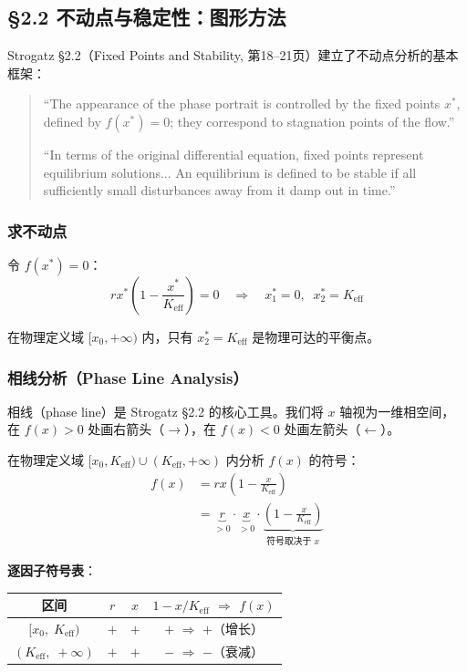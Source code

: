 \documentclass[12pt,a4paper]{article}
\begin{document}
\subsection{\S2.2 不动点与稳定性：图形方法}

Strogatz \S2.2（Fixed Points and Stability, 第18--21页）建立了不动点分析的基本框架：

\begin{quote}
\small
``The appearance of the phase portrait is controlled by the fixed points $x^*$, defined by
$f(x^*) = 0$; they correspond to stagnation points of the flow.''

\medskip
``In terms of the original differential equation, fixed points represent equilibrium solutions...
An equilibrium is defined to be stable if all sufficiently small disturbances away from it damp
out in time.''
\end{quote}

\subsubsection{求不动点}
令 $f(x^*) = 0$：
\begin{equation}
r x^* \left(1 - \frac{x^*}{K_{\text{eff}}}\right) = 0
\quad\Rightarrow\quad x^*_1 = 0,\;\; x^*_2 = K_{\text{eff}}
\end{equation}

在物理定义域 $[x_0, +\infty)$ 内，只有 $x^*_2 = K_{\text{eff}}$ 是物理可达的平衡点。

\subsubsection{相线分析（Phase Line Analysis）}
相线（phase line）是 Strogatz \S2.2 的核心工具。我们将 $x$ 轴视为一维相空间，
在 $f(x) > 0$ 处画右箭头（$\to$），在 $f(x) < 0$ 处画左箭头（$\leftarrow$）。

在物理定义域 $[x_0, K_{\text{eff}}) \cup (K_{\text{eff}}, +\infty)$ 内分析 $f(x)$ 的符号：
\begin{align}
f(x) &= r x \left(1 - \frac{x}{K_{\text{eff}}}\right) \nonumber\\
     &= \underbrace{r}_{>0} \cdot \underbrace{x}_{>0}
        \cdot \underbrace{\left(1 - \frac{x}{K_{\text{eff}}}\right)}_{\text{符号取决于 }x}
\end{align}

\textbf{逐因子符号表}：

\begin{center}
\begin{tabular}{c|c|c|c}
\toprule
区间 & $r$ & $x$ & $1 - x/K_{\text{eff}}$ \quad $\Rightarrow$ \quad $f(x)$ \\
\midrule
$[x_0,\; K_{\text{eff}})$ & $+$ & $+$ & $+$ \quad $\Rightarrow$ \quad $+$（增长） \\
$(K_{\text{eff}},\; +\infty)$ & $+$ & $+$ & $-$ \quad $\Rightarrow$ \quad $-$（衰减） \\
\bottomrule
\end{tabular}
\end{center}
\end{document}
